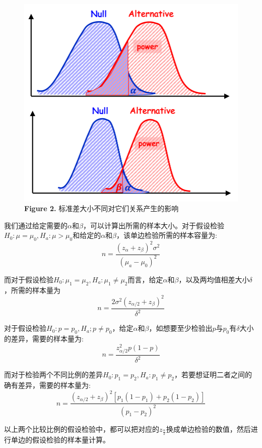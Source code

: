 \documentclass[UTF8]{ctexbook}
\begin{document}
\begin{figure}[h]
\begin{minipage}{0.45\textwidth}
        \includegraphics[width = \textwidth]{Figure 2.png} %
        \caption{\textbf{Figure 2.} 标准差大小不同对它们关系产生的影响}
    \end{minipage}
\end{figure}


\indent 我们通过给定需要的$\alpha$和$\beta$，可以计算出所需的样本大小。对于假设检验$H_0: \mu=\mu_0, H_a:\mu>\mu_0$和给定的$\alpha$和$\beta$，该单边检验所需的样本容量为:
\[
    n=\frac{\left(z_\alpha+z_\beta\right)^2\sigma^2}{\left(\mu_a-\mu_0\right)^2}
\]

而对于假设检验$H_0: \mu_1=\mu_2, H_a: \mu_1\neq\mu_2$而言，给定$\alpha$和$\beta$，以及两均值相差大小$\delta$，所需的样本量为
\[
    n=\frac{2\sigma^2\left(z_{\alpha/2}+z_\beta\right)^2}{\delta^2}
\]

对于假设检验$H_0: p=p_0, H_a; p\neq p_0$，给定$\alpha$和$\beta$，如想要至少检验出$p$与$p_0$有$\delta$大小的差异，需要的样本量为:
\[
    n=\frac{z_{\alpha/2}^2p(1-p)}{\delta^2}
\]

而对于检验两个不同比例的差异$H_0: p_1=p_2, H_a: p_1\neq p_2$，若要想证明二者之间的确有差异，需要的样本量为:
\[
    n=\frac{\left(z_{\alpha/2}+z_\beta\right)^2\left[p_1\left(1-p_1\right)+p_2\left(1-p_2\right)\right]}{\left(p_1-p_2\right)^2}
\]

以上两个比较比例的假设检验中，都可以把对应的$z_\frac{\alpha}{2}$换成单边检验的数值，然后进行单边的假设检验的样本量计算。
\end{document}
